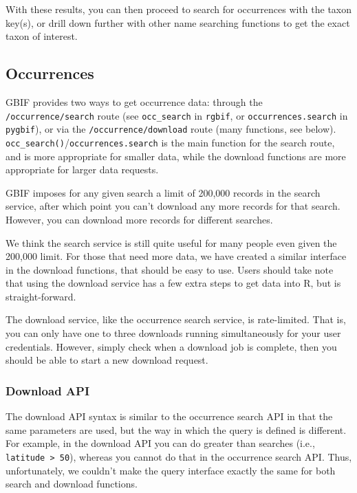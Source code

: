 \documentclass[author-year, review, 11pt]{components/elsarticle} %
\begin{document}
With these results, you can then proceed to search for occurrences with
the taxon key(s), or drill down further with other name searching
functions to get the exact taxon of interest.

\subsection{Occurrences}\label{occurrences}

GBIF provides two ways to get occurrence data: through the
\texttt{/occurrence/search} route (see \texttt{occ\_search} in
\texttt{rgbif}, or \texttt{occurrences.search} in \texttt{pygbif}), or
via the \texttt{/occurrence/download} route (many functions, see below).
\texttt{occ\_search()}/\texttt{occurrences.search} is the main function
for the search route, and is more appropriate for smaller data, while
the download functions are more appropriate for larger data requests.

GBIF imposes for any given search a limit of 200,000 records in the
search service, after which point you can't download any more records
for that search. However, you can download more records for different
searches.

We think the search service is still quite useful for many people even
given the 200,000 limit. For those that need more data, we have created
a similar interface in the download functions, that should be easy to
use. Users should take note that using the download service has a few
extra steps to get data into R, but is straight-forward.

The download service, like the occurrence search service, is
rate-limited. That is, you can only have one to three downloads running
simultaneously for your user credentials. However, simply check when a
download job is complete, then you should be able to start a new
download request.

\subsubsection{Download API}\label{download-api}

The download API syntax is similar to the occurrence search API in that
the same parameters are used, but the way in which the query is defined
is different. For example, in the download API you can do greater than
searches (i.e., \texttt{latitude \textgreater{} 50}), whereas you cannot
do that in the occurrence search API. Thus, unfortunately, we couldn't
make the query interface exactly the same for both search and download
functions.
\end{document}
